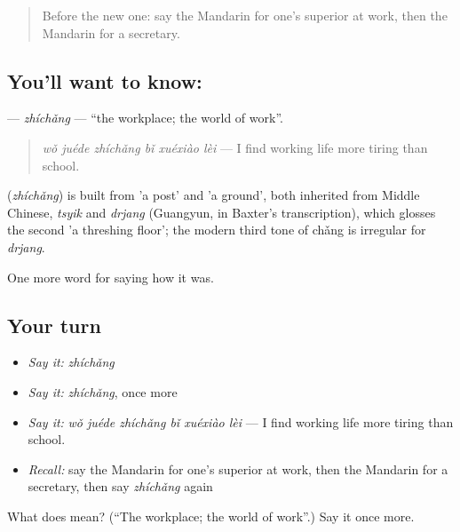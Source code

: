 \label{lesson:ZH-C491-zhichang}



\begin{quote}
Before the new one: say the Mandarin for one's superior at work, then the Mandarin for a secretary.
\end{quote}

\subsection*{You'll want to know: }
\textbf{} — \emph{zhíchǎng} — \textquotedblleft{}the workplace; the world of work\textquotedblright{}.

\begin{quote}
\emph{wǒ juéde zhíchǎng bǐ xuéxiào lèi} — I find working life more tiring than school.
\end{quote}

\begin{cousinweb}
\textbf{} (\emph{zhíchǎng}) is built from  'a post' and  'a ground', both inherited from Middle Chinese, \emph{tsyik} and \emph{drjang} (Guangyun, in Baxter's transcription), which glosses the second 'a threshing floor'; the modern third tone of chǎng is irregular for \emph{drjang}.
\end{cousinweb}

\begin{grammarlens}[title={What you've built}]
One more word for saying how it was.
\end{grammarlens}

\subsection*{Your turn}
\begin{itemize}
\raggedright
  \item \emph{Say it:} \emph{zhíchǎng}
  \item \emph{Say it:} \emph{zhíchǎng}, once more
  \item \emph{Say it:} \emph{wǒ juéde zhíchǎng bǐ xuéxiào lèi} — I find working life more tiring than school.
  \item \emph{Recall:} say the Mandarin for one's superior at work, then the Mandarin for a secretary, then say \emph{zhíchǎng} again
\end{itemize}

\begin{tcolorbox}[breakable,colback=teal!4,colframe=teal!35!black,title={Before you move on}]
What does  mean? (\textquotedblleft{}The workplace; the world of work\textquotedblright{}.) Say it once more.
\end{tcolorbox}
